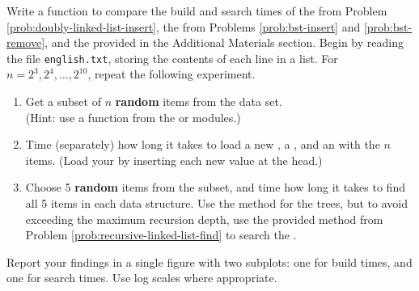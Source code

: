 \begin{problem} %
\label{prob:binary-trees-compare-times}
Write a function to compare the build and search times of the  from Problem \ref{prob:doubly-linked-list-insert}, the  from Problems \ref{prob:bst-insert} and \ref{prob:bst-remove}, and the  provided in the Additional Materials section.
Begin by reading the file \texttt{english.txt}, storing the contents of each line in a list.
For $n=2^3,2^4,\ldots,2^{10}$, repeat the following experiment.
\begin{enumerate}
\item Get a subset of $n$ \textbf{random} items from the data set.
\\(Hint: use a function from the  or  modules.)
\item Time (separately) how long it takes to load a new , a , and an  with the $n$ items.
(Load your  by inserting each new value at the head.)
\item Choose 5 \textbf{random} items from the subset, and time how long it takes to find all 5 items in each data structure.
Use the  method for the trees, but to avoid exceeding the maximum recursion depth, use the provided  method from Problem \ref{prob:recursive-linked-list-find} to search the .
\end{enumerate}
Report your findings in a single figure with two subplots: one for build times, and one for search times.
Use log scales where appropriate.

\begin{comment} %
Your figure should resemble the following plots.
%
\begin{figure}[H] %
    \centering
    \begin{subfigure}[b]{.49\textwidth}
        \centering
        \texttt{[image: figures/BuildTimes.pdf]}
    \end{subfigure}%
    \begin{subfigure}[b]{.49\textwidth}
        \centering
        \texttt{[image: figures/SearchTimes.pdf]}
    \end{subfigure}
\end{figure}
\end{comment}
\end{problem}

